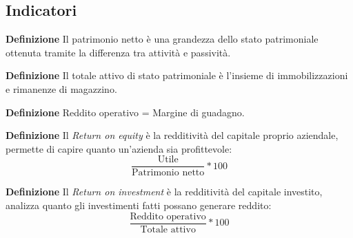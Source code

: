 \documentclass{article}
\newcommand{\df}{\noindent\textbf{Definizione }}
\begin{document}
\subsection{Indicatori}

\df Il patrimonio netto è una grandezza dello stato patrimoniale ottenuta tramite la differenza tra attività e passività.\newline

\df Il totale attivo di stato patrimoniale è l'insieme di immobilizzazioni e rimanenze di magazzino.\newline

\df Reddito operativo = Margine di guadagno.\newline

\df Il \textit{Return on equity} è la redditività del capitale proprio aziendale, permette di capire quanto un'azienda sia profittevole:
$$\frac{\text{Utile}}{\text{Patrimonio netto}}*100$$\newline

\df Il \textit{Return on investment} è la redditività del capitale investito, analizza quanto gli investimenti fatti possano generare reddito:
$$\frac{\text{Reddito operativo}}{\text{Totale attivo}}*100$$\newline
\end{document}
